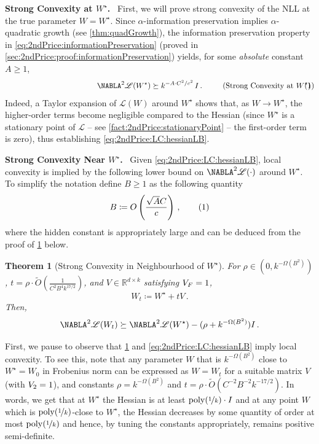 \documentclass[11pt,letterpaper]{article}
\theoremstyle{plain}
\newtheorem{theorem}{Theorem}[section]
\theoremstyle{definition}
\theoremstyle{remark}
\newcommand{\yesnum}{\addtocounter{equation}{1}\tag{\theequation}}
\newcommand{\inparen}[1]{\ensuremath{\left(#1\right)}}
\let\norm\relax
\newcommand{\norm}[1]{\ensuremath{\left\lVert #1 \right\rVert}}
\newcommand{\R}{\mathbb{R}}
\newcommand{\nfrac}[2]{\nicefrac{#1}{#2}}
\newcommand{\poly}{\mathrm{poly}}
\newcommand*{\Nabla}{\boldsymbol\NABLA}
\let\nabla\Nabla
\newcommand{\wt}[1]{\widetilde{#1}}
\newcommand{\customcal}[1]{\euscr{#1}}
\newcommand{\cL}{\customcal{L}}
\renewcommand{\paragraph}[1]{\medskip \noindent\textbf{#1}~}
\newcommand{\negLL}{\ensuremath{\mathscr{L}}}
\newcommand{\Wstar}{{W^\star}}
\renewcommand{\cL}{\negLL}
\begin{document}
{{        \paragraph{Strong Convexity at $W^\star$.}
            First, we will prove strong convexity of the NLL at the true parameter $W = W^\star$.
        Since $\alpha$-information preservation implies $\alpha$-quadratic growth (see \cref{thm:quadGrowth}), the information preservation property in \cref{eq:2ndPrice:informationPreservation} (proved in \cref{sec:2ndPrice:proof:informationPreservation}) yields, for some \textit{absolute} constant $A\ge 1$,
        \[
            \phantom{.}
            \qquad\qquad\qquad\qquad\qquad\quad~~
            \nabla^2 \cL(W^\star) \succeq k^{-A\cdot C^2/c^2}\, I\,. 
            \qquad~~
            \text{(Strong Convexity at $\Wstar$)}\hspace{-10mm}
            \yesnum\label{eq:2ndPrice:LC:hessianLB}
        \]
        Indeed, a Taylor expansion of $\cL(W)$ around $W^\star$ shows that, as $W\to W^\star$, the higher-order terms become negligible compared to the Hessian (since $W^\star$ is a stationary point of $\cL$ -- see \cref{fact:2ndPrice:stationaryPoint} -- the first-order term is zero), thus establishing \cref{eq:2ndPrice:LC:hessianLB}. 

    \paragraph{Strong Convexity Near $W^\star$.}
    Given \cref{eq:2ndPrice:LC:hessianLB}, local convexity is implied by the following lower bound on $\nabla^2 \negLL(\cdot)$ around $\Wstar$.
    To simplify the notation define $B\geq 1$ as the following quantity 
    \[
        B\coloneqq O\inparen{\frac{\sqrt{A}C}{c}}\,,
        \yesnum\label{eq:2ndPrice:LC:defB}
    \]
    where the hidden constant is appropriately large and can be deduced from the proof of \cref{thm:2ndPrice:LC:formal} below.
    \begin{theorem}[Strong Convexity in Neighbourhood of $W^\star$]\label{thm:2ndPrice:LC:formal}
    For $\rho\in(0,k^{-\Omega(B^2)})$, $t=\rho\cdot \wt{O}\inparen{\frac{1}{C^2B^4k^{17/2}}}$, and $V\in\R^{d\times k}$ satisfying $\norm{V}_F=1$, 
    \[
        W_t\coloneqq W^\star+tV\,.
    \]
    Then, 
    \[
        \nabla^2 \cL(W_t) 
        \succeq 
        \nabla^2 \cL(W^\star)
            - (\rho + k^{-\Omega(B^2)}) I\,.
    \] 
    \end{theorem}
    First, we pause to observe that \cref{thm:2ndPrice:LC:formal} and \cref{eq:2ndPrice:LC:hessianLB} imply local convexity.
    To see this, note that any parameter $W$ that is $k^{-\Omega(B^2)}$ close to $W^\star=W_0$ in Frobenius norm can be expressed as $W=W_t$ for a suitable matrix $V$ (with $\norm{V}_2=1$), and constants $\rho=k^{-\Omega(B^2)}$ and $t=\rho\cdot \wt{O}\inparen{{C^{-2}B^{-2}k^{-17/2}}}$. 
    In words, we get that at $W^\star$ the Hessian is at least $\poly(\nfrac{1}{k}) \cdot I$ and at any point $W$ which is $\poly(\nfrac{1}{k})$-close to $W^\star$, the Hessian decreases by some quantity of order at most $\poly(\nfrac{1}{k})$ and hence, by tuning the constants appropriately, remains {positive semi-definite}.

}}
\end{document}
